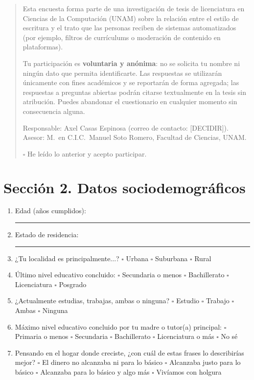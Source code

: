 \begin{quote}
Esta encuesta forma parte de una investigación de tesis de licenciatura en
Ciencias de la Computación (UNAM) sobre la relación entre el estilo de
escritura y el trato que las personas reciben de sistemas automatizados
(por ejemplo, filtros de currículums o moderación de contenido en plataformas).

Tu participación es \textbf{voluntaria y anónima}: no se solicita tu nombre ni
ningún dato que permita identificarte. Las respuestas se utilizarán únicamente
con fines académicos y se reportarán de forma agregada; las respuestas a
preguntas abiertas podrán citarse textualmente en la tesis sin atribución.
Puedes abandonar el cuestionario en cualquier momento sin consecuencia alguna.

Responsable: Axel Casas Espinosa (correo de contacto: [DECIDIR]).
Asesor: M.\ en C.I.C.\ Manuel Soto Romero, Facultad de Ciencias, UNAM.

$\square$ He leído lo anterior y acepto participar.
\end{quote}

\section*{Sección 2. Datos sociodemográficos}

\begin{enumerate}[label=\textbf{D\arabic*.}]
  \item Edad (años cumplidos): \rule{2.5cm}{0.4pt}
  \item Estado de residencia: \rule{5cm}{0.4pt}
  \item ¿Tu localidad es principalmente...? \quad
    $\square$ Urbana \quad $\square$ Suburbana \quad $\square$ Rural
  \item Último nivel educativo concluido: \quad
    $\square$ Secundaria o menos \quad $\square$ Bachillerato \quad
    $\square$ Licenciatura \quad $\square$ Posgrado
  \item ¿Actualmente estudias, trabajas, ambas o ninguna? \quad
    $\square$ Estudio \quad $\square$ Trabajo \quad $\square$ Ambas \quad
    $\square$ Ninguna
  \item Máximo nivel educativo concluido por tu madre o tutor(a) principal:
    \quad $\square$ Primaria o menos \quad $\square$ Secundaria \quad
    $\square$ Bachillerato \quad $\square$ Licenciatura o más \quad
    $\square$ No sé
  \item Pensando en el hogar donde creciste, ¿con cuál de estas frases lo
    describirías mejor? \quad
    $\square$ El dinero no alcanzaba ni para lo básico \quad
    $\square$ Alcanzaba justo para lo básico \quad
    $\square$ Alcanzaba para lo básico y algo más \quad
    $\square$ Vivíamos con holgura
\end{enumerate}

